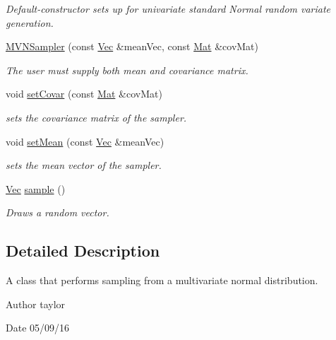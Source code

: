 \begin{DoxyCompactItemize}
\begin{DoxyCompactList}\small\item\em Default-\/constructor sets up for univariate standard Normal random variate generation. \end{DoxyCompactList}\item 
\hyperlink{classdensities_1_1MVNSampler_ad4892d5a5018163f4b69974c4b80b4ea}{M\+V\+N\+Sampler} (const \hyperlink{pmfs_8h_a4c7df05c6f5e8a0d15ae14bcdbc07152}{Vec} \&mean\+Vec, const \hyperlink{pmfs_8h_ae601f56a556993079f730483c574356f}{Mat} \&cov\+Mat)
\begin{DoxyCompactList}\small\item\em The user must supply both mean and covariance matrix. \end{DoxyCompactList}\item 
void \hyperlink{classdensities_1_1MVNSampler_a914d6a896a1b7946085732a5758c16bb}{set\+Covar} (const \hyperlink{pmfs_8h_ae601f56a556993079f730483c574356f}{Mat} \&cov\+Mat)
\begin{DoxyCompactList}\small\item\em sets the covariance matrix of the sampler. \end{DoxyCompactList}\item 
void \hyperlink{classdensities_1_1MVNSampler_a456f1e8ed39efc34ee3a7667dfb2011c}{set\+Mean} (const \hyperlink{pmfs_8h_a4c7df05c6f5e8a0d15ae14bcdbc07152}{Vec} \&mean\+Vec)
\begin{DoxyCompactList}\small\item\em sets the mean vector of the sampler. \end{DoxyCompactList}\item 
\hyperlink{pmfs_8h_a4c7df05c6f5e8a0d15ae14bcdbc07152}{Vec} \hyperlink{classdensities_1_1MVNSampler_a6be29ab6518db1f6457e95469e6970a4}{sample} ()
\begin{DoxyCompactList}\small\item\em Draws a random vector. \end{DoxyCompactList}\end{DoxyCompactItemize}


\subsection{Detailed Description}
A class that performs sampling from a multivariate normal distribution. 

\begin{DoxyAuthor}{Author}
taylor 
\end{DoxyAuthor}
\begin{DoxyDate}{Date}
05/09/16 
\end{DoxyDate}


